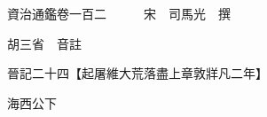 










 


 
 


 

  
  
  
  
  





  
  
  
  
  
 
  

  

  
  
  



  

 
 

  
   




  

  
  


  　　資治通鑑卷一百二　　　宋　司馬光　撰

　　胡三省　音註

　　晉記二十四【起屠維大荒落盡上章敦牂凡二年】

　　海西公下

